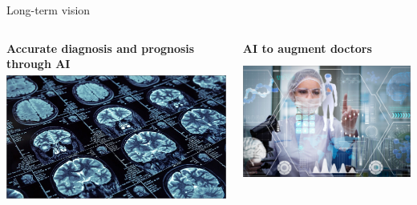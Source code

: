 \documentclass[8pt,xcolor=table,aspectratio=169]{beamer}
\begin{document}
\begin{frame}{Long-term vision}

\vspace{-2em}
\begin{columns}[t]
\begin{column}{0.5\textwidth}
\centering

\textbf{\large Accurate diagnosis and prognosis through AI}\\
\includegraphics[height=4.3cm]{ai-diagnosis}


\end{column}
\begin{column}{0.5\textwidth}
\centering

\textbf{\large AI to augment doctors}\\
\includegraphics[height=4.3cm]{ai_augment_full}

\end{column}
\end{columns}

\end{frame}
\end{document}
